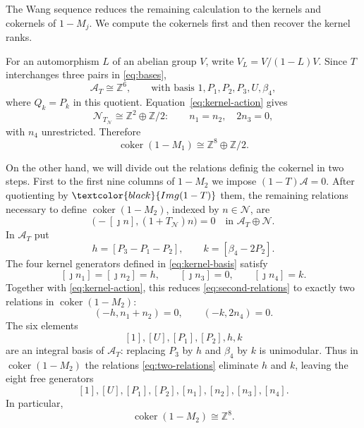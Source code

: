 \documentclass[11pt]{amsart}
\newcommand{\Z}{\mathbb Z}
\newcommand{\coker}{\operatorname{coker}}
\theoremstyle{remark}
\numberwithin{equation}{section}
\begin{document}
The Wang sequence reduces the remaining calculation to the kernels and cokernels of $1-M_j$. We compute the cokernels first and then recover the kernel ranks.

For an automorphism $L$ of an abelian group $V$, write $V_L=V/(1-L)V$. Since $T$ interchanges three pairs in
\eqref{eq:bases},
\[
 \mathcal A_T\cong\Z^6,
 \qquad\text{with basis }1,P_1,P_2,P_3,U,\beta_4,
\]
where $Q_k=P_k$ in this quotient. Equation~\eqref{eq:kernel-action} gives
\[
 \mathcal N_{T_{\mathcal N}}\cong\Z^2\oplus\Z/2:
 \qquad n_1=n_2,\quad 2n_3=0,
\]
with $n_4$ unrestricted. Therefore
\begin{equation}\label{eq:coinv-first}
 \coker(1-M_1)\cong\Z^8\oplus\Z/2.
\end{equation}

On the other hand, we will divide out the relations definig the cokernel in two steps. First to the first nine columns of $1-M_2$ we impose $(1-T)\mathcal A=0$. After quotienting by $\textcolor{black}{Img(1-T)}$ them, the remaining relations necessary to define $\coker(1-M_2)$, %
indexed by $n\in\mathcal N$, are
\begin{equation}\label{eq:second-relations}
 \bigl(-[\jmath n],(1+T_{\mathcal N})n\bigr)=0
 \quad\text{in }\mathcal A_T\oplus\mathcal N.
\end{equation}
In $\mathcal A_T$ put
\[
 h=[P_3-P_1-P_2],\qquad k=[\beta_4-2P_2].
\]
The four kernel generators defined in \eqref{eq:kernel-basis} satisfy
\[
 [\jmath n_1]=[\jmath n_2]=h,\qquad
 [\jmath n_3]=0,\qquad [\jmath n_4]=k.
\]
Together with \eqref{eq:kernel-action}, this reduces \eqref{eq:second-relations} to exactly two relations in $\coker(1-M_2)$:
\begin{equation}\label{eq:two-relations}
 (-h,n_1+n_2)=0,\qquad (-k,2n_4)=0.
\end{equation}
The six elements
\[
 [1],[U],[P_1],[P_2],h,k
\]
are an integral basis of $\mathcal A_T$: replacing $P_3$ by $h$ and $\beta_4$ by $k$ is unimodular. Thus in $\coker(1-M_2)$ the relations \eqref{eq:two-relations} eliminate $h$ and $k$, leaving the eight free generators
\[
 [1],[U],[P_1],[P_2],[n_1],[n_2],[n_3],[n_4].
\]
In particular,
\begin{equation*}
 \coker(1-M_2)\cong\Z^8.
\end{equation*}
\end{document}
